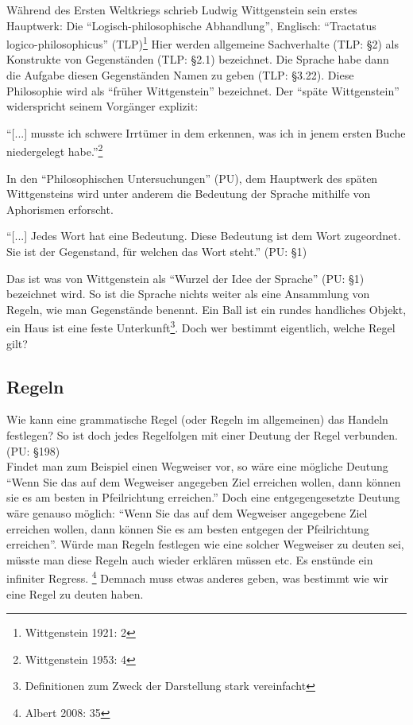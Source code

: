 \documentclass[a4paper,12pt]{article}
\begin{document}
Während des Ersten Weltkriegs schrieb Ludwig Wittgenstein sein erstes Hauptwerk: Die \enquote{Logisch-philosophische Abhandlung}, Englisch: \enquote{Tractatus logico-philosophicus} (TLP)\footnote{Wittgenstein 1921: 2} Hier werden allgemeine Sachverhalte (TLP: §2) als Konstrukte von Gegenständen (TLP: §2.1) bezeichnet. Die Sprache habe dann die Aufgabe diesen Gegenständen Namen zu geben (TLP: §3.22). Diese Philosophie wird als \enquote{früher Wittgenstein} bezeichnet. Der \enquote{späte Wittgenstein} widerspricht seinem Vorgänger explizit:
\begin{displayquote}
\enquote{[...] musste ich schwere Irrtümer in dem erkennen, was ich in jenem ersten Buche niedergelegt habe.}\footnote{Wittgenstein 1953: 4}
\end{displayquote}
In den \enquote{Philosophischen Untersuchungen} (PU), dem Hauptwerk des späten Wittgensteins wird unter anderem die Bedeutung der Sprache mithilfe von Aphorismen erforscht. 
\begin{displayquote}
\enquote{[...] Jedes Wort hat eine Bedeutung. Diese Bedeutung ist dem Wort zugeordnet. Sie ist der Gegenstand, für welchen das Wort steht.} \hspace{1mm} (PU: §1)
\end{displayquote}
Das ist was von Wittgenstein als \enquote{Wurzel der Idee der Sprache} (PU: §1) bezeichnet wird. So ist die Sprache nichts weiter als eine Ansammlung von Regeln, wie man Gegenstände benennt. Ein Ball ist ein rundes handliches Objekt, ein Haus ist eine feste Unterkunft\footnote{Definitionen zum Zweck der Darstellung stark vereinfacht}. Doch wer bestimmt eigentlich, welche Regel gilt?


\subsection{Regeln}
Wie kann eine grammatische Regel (oder Regeln im allgemeinen) das Handeln festlegen? So ist doch jedes Regelfolgen mit einer Deutung der Regel verbunden. (PU: §198) \\
Findet man zum Beispiel einen Wegweiser vor, so wäre eine mögliche Deutung \enquote{Wenn Sie das auf dem Wegweiser angegeben Ziel erreichen wollen, dann können sie es am besten in Pfeilrichtung erreichen.} Doch eine entgegengesetzte Deutung wäre genauso möglich: \enquote{Wenn Sie das auf dem Wegweiser angegebene Ziel erreichen wollen, dann können Sie es am besten entgegen der Pfeilrichtung erreichen}. Würde man Regeln festlegen wie eine solcher Wegweiser zu deuten sei, müsste man diese Regeln auch wieder erklären müssen etc. Es enstünde ein infiniter Regress. \footnote{Albert 2008: 35} Demnach muss etwas anderes geben, was bestimmt wie wir eine Regel zu deuten haben.
\end{document}
